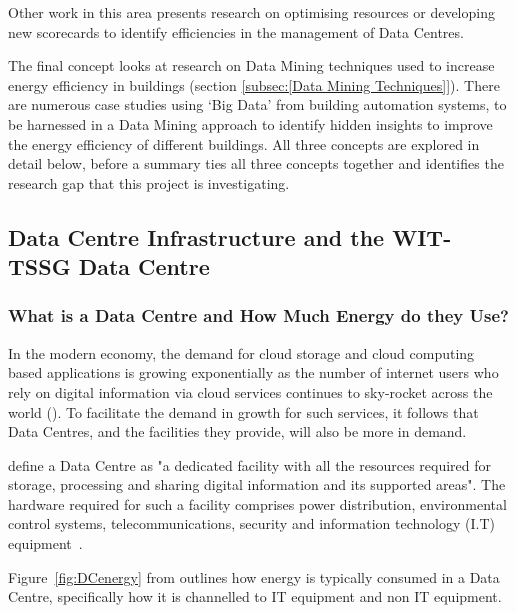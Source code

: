 \documentclass[12pt]{scrartcl}
\begin{document}
Other work in this area presents research on optimising resources or developing new scorecards to identify efficiencies in the management of Data Centres. 

The final concept looks at research on Data Mining techniques used to increase energy efficiency in buildings (section \ref{subsec:[Data Mining Techniques]}). There are numerous case studies using `Big Data' from building automation systems, to be harnessed in a Data Mining approach to identify hidden insights to improve the energy efficiency of different buildings. All three concepts are explored in detail below, before a summary ties all three concepts together and identifies the research gap that this project is investigating.        

\subsection{Data Centre Infrastructure and the WIT-TSSG Data Centre}
\label{subsec:[Data Centre Infrastructure and the WIT-TSSG Data Centre]}

\subsubsection{What is a Data Centre and How Much Energy do they Use?}
\label{subsubsec:[What is a Data Centre and How Much Energy do they Use?]}

In the modern economy, the demand for cloud storage and cloud computing based applications is growing exponentially as the number of internet users who rely on digital information via cloud services continues to sky-rocket across the world (\citep{VASUDEVAN201794}). To facilitate the demand in growth for such services, it follows that Data Centres, and the facilities they provide, will also be more in demand.  

\citet{edsdoj.99f37e7899fb4fcaabdaa81e395626c420180101} define a Data Centre as "a dedicated facility with all the resources required for storage, processing and sharing digital information and its supported areas".  The hardware required for such a facility comprises power distribution, environmental control systems, telecommunications, security and information technology (I.T) equipment~\citep{edsdoj.99f37e7899fb4fcaabdaa81e395626c420180101}. 

Figure~\ref{fig:DCenergy} from \citep{edsdoj.99f37e7899fb4fcaabdaa81e395626c420180101} outlines how energy is typically consumed in a Data Centre, specifically how it is channelled to IT equipment and non IT equipment.
\end{document}
